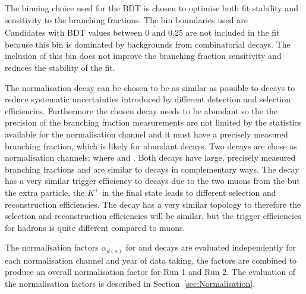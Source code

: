 The binning choice used for the BDT is chosen to optimise both fit stability and sensitivity to the \bmumu branching fractions. The bin boundaries used are
\begin{equation}
[0.25, 0.4, 0.5, 0.6, 1.0].
\label{eq:BDTbins}
\end{equation}
Candidates with BDT values between 0 and 0.25 are not included in the fit because this bin is dominated by backgrounds from combinatorial decays. The inclusion of this bin does not improve the branching fraction sensitivity and reduces the stability of the fit. %

The normalisation decay can be chosen to be as similar as possible to \bmumu decays to reduce systematic uncertainties introduced by different detection and selection efficiencies. Furthermore the chosen decay needs to be abundant so the the precision of the \bmumu branching fraction measurements are not limited by the statistics available for the normalisation channel and it must have a precisely measured branching fraction, which is likely for abundant decays. Two decays are chose as normalisation channels; \bujpsik where \jpsimumu and \bdkpi. Both decays have large, precisely measured branching fractions and are similar to \bmumu decays in complementary ways. The \bujpsik decay has a very similar trigger efficiency to \bmumu decays due to the two muons from the \jpsi but the extra particle, the $K^{+}$ in the final state leads to different selection and reconstruction efficiencies. The \bdkpi decay has a very similar topology to \bmumu therefore the selection and reconstruction efficiencies will be similar, but the trigger efficiencies for hadrons is quite different compared to muons.  

The normalisation factors $\alpha_{d(s)}$ for \bdmumu and \bsmumu decays are evaluated independently for each normalisation channel and year of data taking, the factors are combined to produce an overall normalisation factor for Run 1 and Run 2. The evaluation of the normalisation factors is described in Section~\ref{sec:Normalisation}.




